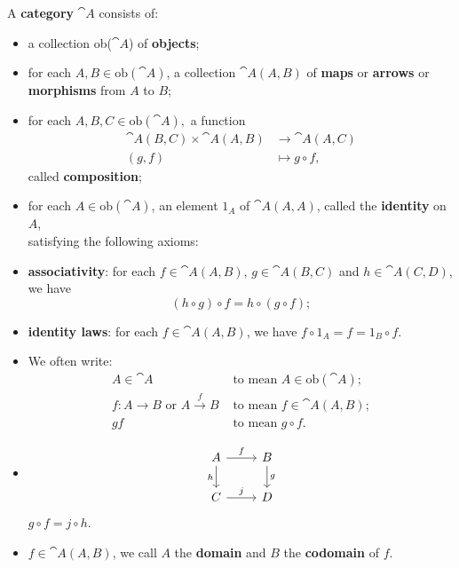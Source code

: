 \documentclass[11pt,a4paper]{article}
\begin{document}
\begin{definition}
    A \textbf{category} $\cat{A}$ consists of:
\end{definition}
\begin{itemize}
    \item a collection ob($\cat{A}$) of \textbf{objects};
    \item for each $A,B \in \text{ob}(\cat{A})$, a collection $\cat{A}(A,B)$ of \textbf{maps} or \textbf{arrows} or \textbf{morphisms} from $A$ to $B$;
    \item for each $A,B,C\in \text{ob}(\cat{A}),$ a function
        \begin{align*}
            \cat{A}(B,C)\times \cat{A}(A,B) &\to \cat{A}(A,C) \\
            (g,f) &\mapsto g\circ f,
        \end{align*}
        called \textbf{composition};
    \item for each $A\in \text{ob}(\cat{A})$, an element $1_{A}$ of $\cat{A}(A, A)$, called the \textbf{identity} on $A$,\vspace{5mm} \\
        satisfying the following axioms:
    \item \textbf{associativity}: for each $f\in \cat{A}(A,B)$, $g\in \cat{A}(B,C)$ and $h\in \cat{A}(C,D)$, we have $$(h\circ g)\circ f=h\circ (g\circ f);$$
    \item \textbf{identity laws}: for each $f\in \cat{A}(A,B)$, we have $f\circ 1_{A}=f=1_{B}\circ f$.
\end{itemize}

\begin{remark}
    \begin{itemize}
        \item We often write:
            \begin{align*}
                A\in\cat{A} &\text{ to mean } A\in \text{ob}(\cat{A});\\
                f: A\to B \text{ or } A\xrightarrow{f}B &\text{ to mean } f\in \cat{A}(A,B);\\
                gf &\text{ to mean } g\circ f.
            \end{align*}
        \item {}
            \begin{equation*}
            \begin{tikzcd}
                A \arrow[r, "f"] \arrow[d, "h"'] & B \arrow[d, "g"] \\
                C \arrow[r, "j"] & D
            \end{tikzcd}
            \end{equation*}
             $g\circ f=j\circ h$.
        \item {} $f\in \cat{A}(A,B)$, we call $A$ the \textbf{domain} and $B$ the \textbf{codomain} of $f$.  
        
    \end{itemize}
\end{remark}
\end{document}

